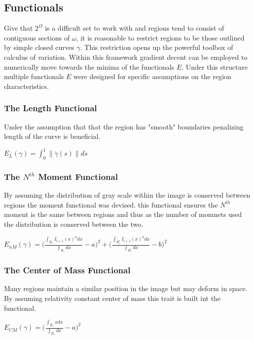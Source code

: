 \documentclass{article}
\begin{document}
		\subsection{Functionals} \label{sec:funcderiv}
			Give that $2^\Omega$ is a difficult set to work with and regions tend to consist of contiguous sections of $\omega$, it is reasonable to restrict regions to be those outlined by simple closed curves $\gamma$. This restriction opens up the powerful toolbox of calculus of variation. Within this framework gradient decent can be employed to numerically move towards the minima of the functionals $E$. Under this structure multiple functionals $E$ were designed for specific assumptions on the region characteristics.


			\subsubsection{The Length Functional}
				Under the assumption that that the region has "smooth" boundaries penalizing length of the curve is beneficial. 
				\begin{center}
					$E_L(\gamma) = \int_{0}^1{\|\dot\gamma(s)\|ds}$
				\end{center}

			\subsubsection{The $N^{th}$ Moment Functional}
				By assuming the distribution of gray scale within the image is conserved between regions the moment functional was devised. this functional ensures the $N^{th}$ moment is the same between regions and thus as the number of momnets used the distribution is conserved between the two.
				\begin{center}
				$E_{nM}(\gamma) = \Bigg(\frac{\int_{R_\gamma}{I_{l+1}(x)^n dx}}{\int_{R_\gamma}{dx}} - a\Bigg)^2 + \Bigg(\frac{\int_{R^{c}_\gamma}{I_{l+1}(x)^n dx}}{\int_{R^{c}_\gamma}{dx}} - b\Bigg)^2$ 
				\end{center}
			\subsubsection{The Center of Mass Functional}
				Many regions maintain a similar position in the image but may deform in space. By assuming relativity constant center of mass this trait is built int the functional.
				\begin{center}
					$E_{CM}(\gamma) = \Bigg(\frac{\int_{R_\gamma}{x dx}}{\int_{R_\gamma}{dx}} - a\Bigg)^2$ 
				\end{center}
\end{document}
